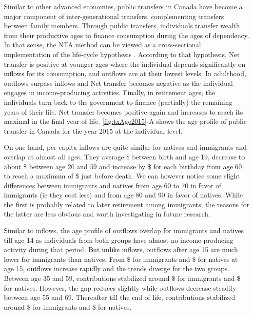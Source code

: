 Similar to other advanced economies, public transfers in Canada have become a major component of inter-generational transfers, complementing transfers between family members.
Through public transfers, individuals transfer wealth from their productive ages to finance consumption during the ages of dependency.
In that sense, the NTA method can be viewed as a cross-sectional implementation of the life-cycle hypothesis \citep{Ando:1963ea,Deaton:2005vr}.
According to that hypothesis, Net transfer is positive at younger ages where the individual depends significantly on inflows for its consumption, and outflows are at their lowest levels.
In adulthood, outflows surpass inflows and Net transfer becomes negative as the individual engages in income-producing activities.
Finally, in retirement ages, the individuals turn back to the government to finance (partially) the remaining years of their life.
Net transfer becomes positive again and increases to reach its maximal in the final year of life. \autoref{fig:txAge2015}-A shows the age profile of public transfer in Canada for the year 2015 at the individual level.

\vspace{0.7em}\par
On one hand, per-capita inflows are quite similar for natives and immigrants and overlap at almost all ages.
They average \$ between birth and age 19, decrease to about \$ between age 20 and 59 and increase by \$ for each birthday from age 60 to reach a maximum of \$ just before death.
We can however notice some slight differences between immigrants and natives from age 60 to 70 in favor of immigrants (ie they cost less) and from age 80 and 90 in favor of natives.
While the first is probably related to later retirement among immigrants, the reasons for the latter are less obvious and worth investigating in future research.

\vspace{0.7em}\par
Similar to inflows, the age profile of outflows overlap for immigrants and natives till age 14 as individuals from both groups have almost no income-producing activity during that period.
But unlike inflows, outflows after age 15 are much lower for immigrants than natives.
From \$ for immigrants and \$ for natives at age 15, outflows increase rapidly and the trends diverge for the two groups.
Between age 35 and 59, contributions stabilized around \$ for immigrants and \$ for natives.
However, the gap reduces slightly while outflows decrease steadily between age 55 and 69.
Thereafter till the end of life, contributions stabilized around \$ for immigrants and \$ for natives.

